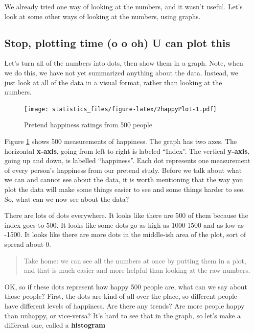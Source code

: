 \documentclass[]{book}
\begin{document}
We already tried one way of looking at the numbers, and it wasn't useful. Let's look at some other ways of looking at the numbers, using graphs.

\hypertarget{stop-plotting-time-o-o-oh-u-can-plot-this}{%
\subsection{Stop, plotting time (o o oh) U can plot this}\label{stop-plotting-time-o-o-oh-u-can-plot-this}}

Let's turn all of the numbers into dots, then show them in a graph. Note, when we do this, we have not yet summarized anything about the data. Instead, we just look at all of the data in a visual format, rather than looking at the numbers.

\begin{figure}
\centering
\texttt{[image: statistics\_files/figure-latex/2happyPlot-1.pdf]}
\caption{\label{fig:2happyPlot}Pretend happiness ratings from 500 people}
\end{figure}

Figure \ref{fig:2happyPlot} shows 500 measurements of happiness. The graph has two axes. The horizontal \textbf{x-axis}, going from left to right is labeled ``Index''. The vertical \textbf{y-axis}, going up and down, is labelled ``happiness''. Each dot represents one measurement of every person's happiness from our pretend study. Before we talk about what we can and cannot see about the data, it is worth mentioning that the way you plot the data will make some things easier to see and some things harder to see. So, what can we now see about the data?

There are lots of dots everywhere. It looks like there are 500 of them because the index goes to 500. It looks like some dots go as high as 1000-1500 and as low as -1500. It looks like there are more dots in the middle-ish area of the plot, sort of spread about 0.

\begin{quote}
Take home: we can see all the numbers at once by putting them in a plot, and that is much easier and more helpful than looking at the raw numbers.
\end{quote}

OK, so if these dots represent how happy 500 people are, what can we say about those people? First, the dots are kind of all over the place, so different people have different levels of happiness. Are there any trends? Are more people happy than unhappy, or vice-versa? It's hard to see that in the graph, so let's make a different one, called a \textbf{histogram}
\end{document}
